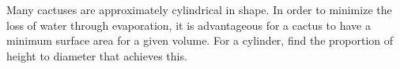 Many cactuses are approximately cylindrical in shape. In order
to minimize the loss of water through evaporation, it is
advantageous for a cactus to have a minimum surface area
for a given volume. For a cylinder, find the proportion
of height to diameter that achieves this.\answercheck
